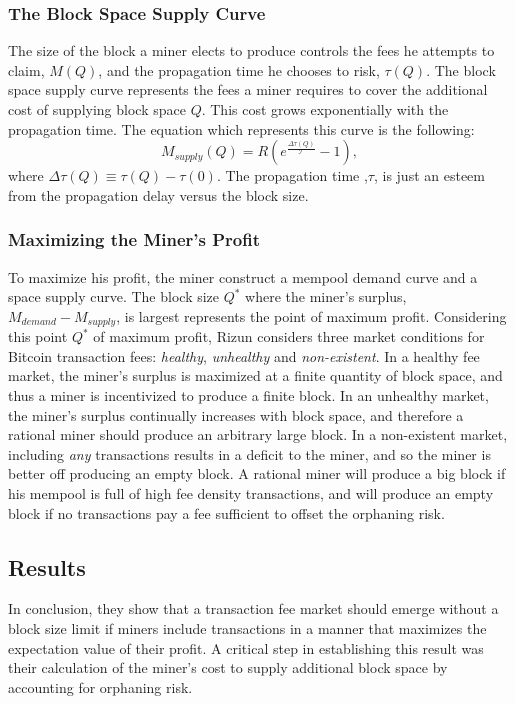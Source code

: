 \subsubsection{The Block Space Supply Curve}
\label{sec:blockspacesupply}
The size of the block a miner elects to produce controls the fees he attempts to claim, $M(Q)$,
and the propagation time he chooses to risk, $\tau(Q)$. The block space supply curve represents
the fees a miner requires to cover the additional cost of
supplying block space $Q$. This cost grows
exponentially with the propagation time. The equation which
represents this curve is the following:
\begin{equation}
\label{eq:blockspacesupply}
M_{supply}(Q) = R\left(e^{\frac{\Delta \tau (Q)}{\mathcal{T}}} - 1\right),
\end{equation}
where $\Delta \tau (Q) \equiv \tau(Q) - \tau(0)$.
The propagation time ,$\tau$, is just an esteem from
the propagation delay versus the block size.

\subsubsection{Maximizing the Miner's Profit}
To maximize his profit, the miner construct a mempool
demand curve and a space supply curve.
The block size $Q^*$ where the miner's surplus,
$M_{demand} - M_{supply}$, is largest represents
the point of maximum profit. Considering this point $Q^*$ of maximum
profit, Rizun considers three market conditions for Bitcoin transaction
fees: \emph{healthy}, \emph{unhealthy} and \emph{non-existent}.
In a healthy fee market, the miner's surplus is maximized
at a finite quantity of block space, and thus a miner is
incentivized to produce a finite block. In an unhealthy
market, the miner's surplus continually increases with
block space, and therefore a rational miner should produce
an arbitrary large block. In a non-existent market,
including \emph{any} transactions results in a deficit
to the miner, and so the miner is better off
producing an empty block. A rational
miner will produce a big block if his mempool
is full of high fee density transactions, and
will produce an empty block if no transactions pay a fee sufficient
to offset the orphaning risk.

\subsection{Results}
In conclusion, they show that a transaction fee market should
emerge without a block size limit if miners
include transactions in a manner that maximizes
the expectation value of their profit. A
critical step in establishing this result was their
calculation of the miner’s cost to supply
additional block space by accounting for orphaning risk.

